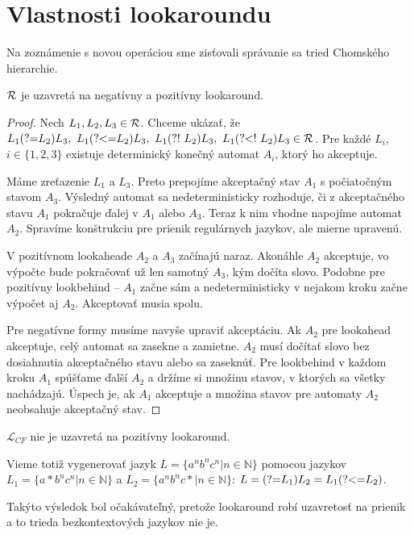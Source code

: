 \documentclass{svk_long_sk}
\def\R{{\cal R}} %
\def\L{\mathscr{L}} %
\def\N{\mathds{N}} %
\def\lookahead{\text{(?=}}
\def\nlookahead{\text{(?!~}}
\def\lookbehind{\text{(?\textless =}}
\def\nlookbehind{\text{(?\textless !~}}
\begin{document}
\section{Vlastnosti lookaroundu}
Na zoznámenie s novou operáciou sme zisťovali správanie sa tried Chomského hierarchie.
\begin{theorem}\label{R_uz_lalb}
$\R$ je uzavretá na negatívny a pozitívny look\-around.
\end{theorem}
\begin{proof}
Nech $L_1,L_2,L_3\in\R$. Chceme ukázať, že $L_1\lookahead L_2)L_3,~ L_1\lookbehind L_2)L_3,~ L_1\nlookahead L_2)L_3,~ L_1\nlookbehind L_2)L_3\allowbreak \in \R$. Pre každé $L_i$, $i \in \lbrace 1,2,3\rbrace$ existuje determinický konečný automat $A_i$, ktorý ho akceptuje.

Máme zreťazenie $L_1$ a $L_3$. Preto prepojíme akceptačný stav $A_1$ s počiatočným stavom $A_3$. Výsledný automat sa nedeterministicky rozhoduje, či z akceptačného stavu $A_1$ pokračuje ďalej v $A_1$ alebo $A_3$. Teraz k nim vhodne napojíme automat $A_2$. Spravíme konštrukciu pre prienik regulárnych jazykov, ale mierne upravenú.

V pozitívnom lookaheade $A_2$ a $A_3$ začínajú naraz. Akonáhle $A_2$ akceptuje, vo výpočte bude pokračovať už len samotný $A_3$, kým dočíta slovo. Podobne pre pozitívny lookbehind -- $A_1$ začne sám a nedeterministicky v nejakom kroku začne výpočet aj $A_2$. Akceptovať musia spolu.

Pre negatívne formy musíme navyše upraviť akceptáciu. Ak $A_2$ pre lookahead akceptuje, celý automat sa zasekne a zamietne. $A_2$ musí dočítať slovo bez dosiahnutia akceptačného stavu alebo sa zaseknúť. Pre lookbehind v každom kroku $A_1$ spúšťame ďalší $A_2$ a držíme si množinu stavov, v ktorých sa všetky nachádzajú. Úspech je, ak $A_1$ akceptuje a množina stavov pre automaty $A_2$ neobsahuje akceptačný stav.

\end{proof}

\begin{theorem}
$\L_{CF}$ nie je uzavretá na pozitívny lookaround.
\end{theorem}
Vieme totiž vygenerovať jazyk $L=\lbrace a^nb^nc^n|n\in\N\rbrace$ pomocou jazykov $L_1=\lbrace a*b^nc^n|n\in\N\rbrace$ a $L_2=\lbrace a^nb^nc*|n\in\N\rbrace$: $L=\lookahead L_1)L_2 =L_1\lookbehind L_2)$.

Takýto výsledok bol očakávateľný, pretože lookaround robí uzavretosť na prienik a to trieda bezkontextových jazykov nie je.
\end{document}
